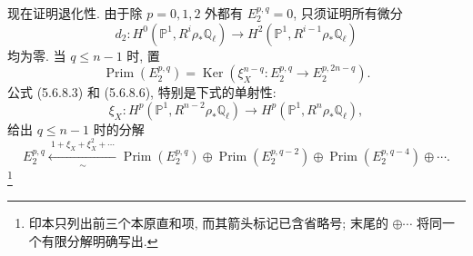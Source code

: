 现在证明退化性. 由于除 $p=0,1,2$ 外都有 $E_2^{p,q}=0$, 只须证明所有微分
\[
d_2:H^0(\mathbb P^1,R^i\rho_*\mathbb Q_\ell)
\longrightarrow H^2(\mathbb P^1,R^{i-1}\rho_*\mathbb Q_\ell)
\]
均为零. 当 $q\leq n-1$ 时, 置
\begin{equation}\tag{5.6.8.9}
\operatorname{Prim}(E_2^{p,q})
=\operatorname{Ker}\!\left(
\xi_X^{n-q}:E_2^{p,q}\longrightarrow E_2^{p,2n-q}
\right).
\end{equation}
公式 (5.6.8.3) 和 (5.6.8.6), 特别是下式的单射性:
\[
\xi_X:H^p(\mathbb P^1,R^{n-2}\rho_*\mathbb Q_\ell)
\longrightarrow H^p(\mathbb P^1,R^n\rho_*\mathbb Q_\ell),
\]
给出 $q\leq n-1$ 时的分解
\begin{equation}\tag{5.6.8.10}
E_2^{p,q}
\xleftarrow[\sim]{\ 1+\xi_X+\xi_X^2+\cdots\ }
\operatorname{Prim}(E_2^{p,q})
\oplus\operatorname{Prim}(E_2^{p,q-2})
\oplus\operatorname{Prim}(E_2^{p,q-4})
\oplus\cdots.
\end{equation}
\footnote{印本只列出前三个本原直和项, 而其箭头标记已含省略号; 末尾的 $\oplus\cdots$ 将同一个有限分解明确写出.}
